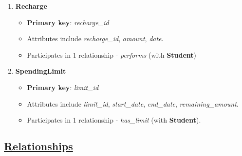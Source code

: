\documentclass[a4paper,12pt]{article}
\begin{document}
\begin{enumerate}
    \item \textbf{Recharge}
    \begin{itemize}
        \item \textbf{Primary key}: \textit{recharge\_id}
        \item Attributes include \textit{recharge\_id}, \textit{amount}, \textit{date}.
        \item Participates in 1 relationship - \textit{performs} (with \textbf{Student})
    \end{itemize}
    
    \item \textbf{SpendingLimit}
    \begin{itemize}
        \item \textbf{Primary key}: \textit{limit\_id}
        \item Attributes include \textit{limit\_id}, \textit{start\_date}, \textit{end\_date}, \textit{remaining\_amount}.
        \item Participates in 1 relationship - \textit{has\_limit} (with \textbf{Student}).
    \end{itemize}
    
\end{enumerate}

\subsection*{\underline{Relationships}}
\end{document}
